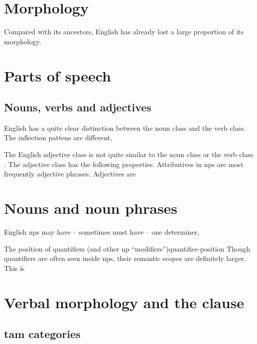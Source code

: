 \documentclass[UTF8, a4paper, oneside, scheme=plain]{ctexrep}
\newcommand*{\citepage}[1]{pp.~{#1}}
\begin{document}
\section{Morphology}

Compared with its ancestors, 
English has already lost a large proportion of its morphology.


\section{Parts of speech}


\subsection{Nouns, verbs and adjectives}

English has a quite clear distinction between the noun class and the verb class.
The inflection pattens are different, 

The English adjective class is not quite similar to the noun class or the verb class 
\citep[\citepage{73}]{dixon2010basic2}.
The adjective class has the following properties.
Attributives in \acs{np}s are most frequently adjective phrases.
Adjectives are 

\section{Nouns and noun phrases}

English \acs{np}s may have -- sometimes must have -- 
one determiner, 

\begin{theorybox}{The position of quantifiers (and other \acs{np} ``modifiers'')}{quantifier-position}
    Though quantifiers are often seen inside \acs{np}s,
    their semantic scopes are definitely larger.
    This is 
\end{theorybox}

\section{Verbal morphology and the clause}

\subsection{\acs{tam} categories}
\end{document}
